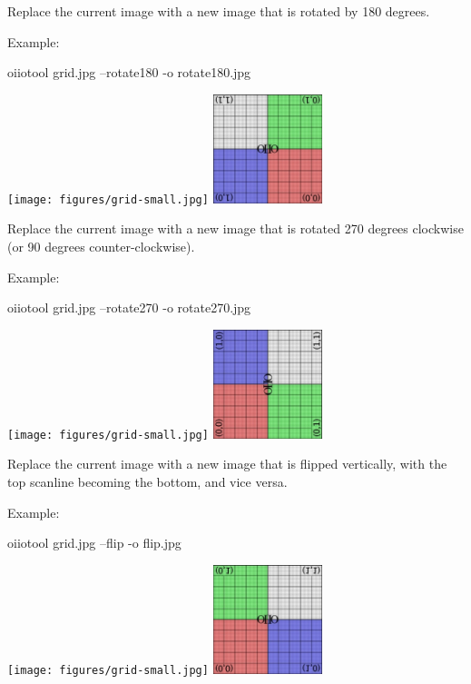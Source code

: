 Replace the current image with a new image that is rotated by
180 degrees.

\noindent Example:
\begin{code}
    oiiotool grid.jpg --rotate180 -o rotate180.jpg
\end{code}
\spc \texttt{[image: figures/grid-small.jpg]} 
\raisebox{40pt}{\large $\rightarrow$}
\includegraphics[width=1.25in]{figures/rotate180.jpg} \\
\apiend

Replace the current image with a new image that is rotated 270 degrees
clockwise (or 90 degrees counter-clockwise).

\noindent Example:
\begin{code}
    oiiotool grid.jpg --rotate270 -o rotate270.jpg
\end{code}
\spc \texttt{[image: figures/grid-small.jpg]}
\raisebox{40pt}{\large $\rightarrow$}
\includegraphics[width=1.25in]{figures/rotate270.jpg} \\
\apiend

Replace the current image with a new image that is flipped vertically,
with the top scanline becoming the bottom, and vice versa.

\noindent Example:
\begin{code}
    oiiotool grid.jpg --flip -o flip.jpg
\end{code}
\spc \texttt{[image: figures/grid-small.jpg]} 
\raisebox{40pt}{\large $\rightarrow$}
\includegraphics[width=1.25in]{figures/flip.jpg} \\
\apiend

